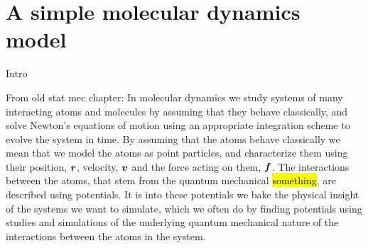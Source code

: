 \chapter{A simple molecular dynamics model\label{chap:simple_md_program}}
Intro

From old stat mec chapter:
In molecular dynamics we study systems of many interacting atoms and molecules by assuming that they behave classically, and solve Newton's equations of motion using an appropriate integration scheme to evolve the system in time. By assuming that the atoms behave classically we mean that we model the atoms as point particles, and characterize them using their position, $\boldsymbol{r}$, velocity, $\boldsymbol{v}$ and the force acting on them, $\boldsymbol{f}$. The interactions between the atoms, that stem from the quantum mechanical \hl{something}, are described using potentials. It is into these potentials we bake the physical insight of the systems we want to simulate, which we often do by finding potentials using studies and simulations of the underlying quantum mechanical nature of the interactions between the atoms in the system.

